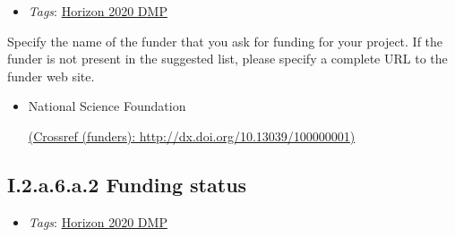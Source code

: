 \documentclass[a4paper,12pt]{report}
\begin{document}
\label{1e85da40-bbfc-4180-903e-6c569ed2da38.c3dabaaf-c946-4a0d-889c-ede966f97667.01fb6972-a748-47d6-9974-6cfa59b4b156.36a87eac-402d-43fb-a0df-ac5963bdf87d.56b169cb-bda4-40ea-a0a3-91dacaec41d5.0b12fb8c-ee0f-40c0-9c53-b6826b786a0c}


\begin{itemize}
  \item \textit{Tags}: \ul{Horizon 2020 DMP}
  \end{itemize}


\noindent
\begin{markdown}
Specify the name of the funder that you ask for funding for your project. If the funder is not present in the suggested list, please specify a complete URL to the funder web site.

\end{markdown}



\begin{itemize}
  \item[\CheckmarkBold]
  \begin{markdown}
  National Science Foundation
  \end{markdown}
  \href{http://dx.doi.org/10.13039/100000001}{(Crossref (funders): http://dx.doi.org/10.13039/100000001)}
  
\end{itemize}


\subsection*{\protect\textcolor{colorSecId}{I.2.a.6.a.2} Funding status}

\label{1e85da40-bbfc-4180-903e-6c569ed2da38.c3dabaaf-c946-4a0d-889c-ede966f97667.01fb6972-a748-47d6-9974-6cfa59b4b156.36a87eac-402d-43fb-a0df-ac5963bdf87d.56b169cb-bda4-40ea-a0a3-91dacaec41d5.54ff3b18-652f-4235-8f9f-3c87e2d63169}


\begin{itemize}
  \item \textit{Tags}: \ul{Horizon 2020 DMP}
  \end{itemize}
\end{document}

